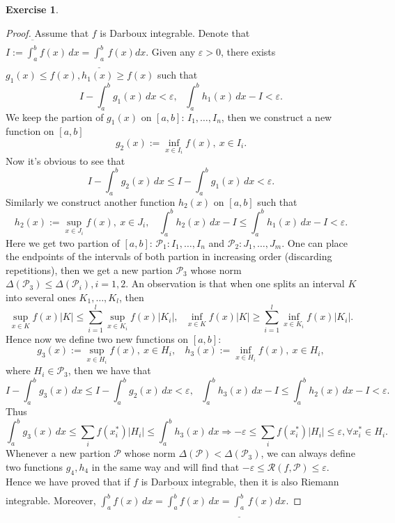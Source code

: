 \documentclass{article}
\newtheorem{ex}{Exercise}[subsection]
\begin{document}
\begin{ex}\end{ex}
\begin{proof}
Assume that $f$ is Darboux integrable.
Denote that $I := \overline{\int_a^b} f(x)\, dx = \underline{\int_a^b}\, f(x) dx$. Given any $\varepsilon > 0$, there 
exists $g_1(x) \leq f(x), h_1(x) \geq f(x)$ such that $$
I - \int_a^b g_1(x)\, dx < \varepsilon,\ \ \ \int_a^b h_1(x)\, dx - I < \varepsilon.
$$
We keep the partion of $g_1(x)$ on $[a, b]$: $I_1, \dots, I_n$, then we construct a new function on $[a, b]$$$
g_2(x) := \inf_{x \in I_i} f(x),\ x \in I_i.
$$Now it's obvious to see that $$
I - \int_a^b g_2(x)\, dx \leq I - \int_a^b g_1(x)\, dx < \varepsilon.
$$Similarly we construct another function $h_2(x)$ on $[a, b]$ such that$$
h_2(x) := \sup_{x \in J_i} f(x),\ x \in J_i,\ \ \ \ \int_a^b h_2(x)\, dx - I \leq \int_a^b h_1(x)\, dx - I < \varepsilon.
$$
Here we get two partion of $[a, b]$: $\mathcal{P}_1: I_1, \dots, I_n$ and $\mathcal{P}_2: J_1, \dots, J_m$. One 
can place the endpoints of the intervals of both partion in increasing order (discarding repetitions), then we get 
a new partion $\mathcal{P}_3$ whose norm $\Delta(\mathcal{P}_3) \leq \Delta(\mathcal{P}_i), i = 1, 2$. An observation
is that when one splits an interval $K$ into several ones $K_1, \dots, K_l$, then $$
\sup_{x \in K} f(x) |K| \leq \sum_{i = 1}^l \sup_{x \in K_i} f(x) |K_i|,\ \ \ 
\inf_{x \in K} f(x) |K| \geq \sum_{i = 1}^l \inf_{x \in K_i} f(x) |K_i|.
$$Hence now we define two new functions on $[a, b]$:$$
g_3(x) := \sup_{x \in H_i} f(x),\ x \in H_i,\ \ \ \ h_3(x) := \inf_{x \in H_i} f(x),\ x \in H_i,
$$where $H_i \in \mathcal{P}_3$, then we have that$$
I - \int_a^b g_3(x)\, dx \leq I - \int_a^b g_2(x)\, dx < \varepsilon,\ \ \ 
\int_a^b h_3(x)\, dx - I \leq \int_a^b h_2(x)\, dx - I < \varepsilon.
$$Thus$$
\int_a^b g_3(x)\, dx \leq \sum_{i} f(x_i^*) |H_i| \leq \int_a^b h_3(x)\, dx \Rightarrow
-\varepsilon \leq \sum_i f(x_i^*)|H_i| \leq \varepsilon, \forall x_i^* \in H_i.
$$
Whenever a new partion $\mathcal{P}$ whose norm $\Delta(\mathcal{P}) < \Delta(\mathcal{P}_3)$, we can always
define two functions $g_4, h_4$ in the same way and will find that $-\varepsilon \leq \mathcal{R}(f, \mathcal{P}) 
\leq \varepsilon$. Hence we have proved that if $f$ is Darboux integrable, then it is also Riemann integrable.
Moreover, $\int_a^b f(x)\, dx = \overline{\int_a^b} f(x)\, dx = \underline{\int_a^b}\, f(x) dx$.


\end{proof}
\end{document}
